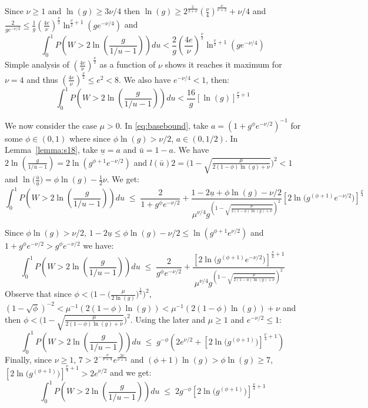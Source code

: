\documentclass[aos]{imsart}
\theoremstyle{plain}
\begin{document}
\begin{supplement}
Since $\nu \geq 1$ and $\ln(g) \geq 3\nu/4$ then $\ln(g) \geq 2^{\frac{2}{2+\nu}} \left(\frac{\nu}{4}\right)^{\frac{\nu}{\nu+2}}+\nu/4$ and $\frac{2}{g e^{-\nu / 2}}\leq \frac{1}{g} \left(\frac{4 e}{\nu}\right)^{\frac{\nu}{2}} \ln^{\frac{\nu}{2}+1}\left(ge^{-\nu / 4}\right)$ and 
\begin{equation*}
\int_0^1 P\left(W>2 \ln \left(\frac{g}{1 / u-1}\right)\right) d u < \frac{2}{g} \left(\frac{4 e}{\nu}\right)^{\frac{\nu}{2}} \ln^{\frac{\nu}{2}+1}\left(ge^{-\nu / 4}\right)
\end{equation*}
Simple analysis of $\left(\frac{4 e}{\nu}\right)^{\frac{\nu}{2}}$ as a function of $\nu$ shows it reaches it maximum for $\nu=4$ and thus $\left(\frac{4 e}{\nu}\right)^{\frac{\nu}{2}}\leq e^2 < 8$. We also have $e^{-\nu / 4} <1$, then:
\begin{equation*}
\int_0^1 P\left(W>2 \ln \left(\frac{g}{1 / u-1}\right)\right) d u < \frac{16}{g} [\ln\left(g\right)]^{\frac{\nu}{2}+1}
\end{equation*}

We now consider the case $\mu>0$. In \eqref{eq:basebound}, take  $a=\left(1+g^{\phi}e^{-\nu/ 2}\right)^{-1}$ for some $\phi\in(0,1)$ where since $\phi\ln(g)> \nu/2$, $a\in(0,1/2)$. In Lemma~\ref{lemma:s18}, take $\underline{u}=a$ and $\bar{u}=1-a$. We have  $2 \ln \left(\frac{g}{1 / \bar{u}-1}\right)=2\ln(g^{\phi+1}e^{-\nu/2})$ and $l(\bar{u})2=\big(1-\sqrt{\frac{\mu}{2(1-\phi)\ln(g)+\nu}}\big)^2<1$ and $\ln\big(\frac{\bar{u}}{\underline{u}}\big)=\phi\ln(g)-\tfrac{1}{2}\nu$. We get:
$$
\int_0^1 P\left(W>2 \ln \left(\frac{g}{1 / u-1}\right)\right) d u \;\leq\; \frac{2}{1+g^{\phi}e^{-\nu/2}}+ 
\frac{1-2\underline{u}+\phi\ln(g)-\nu/2}{\mu^{\nu/4}g^{(1-\sqrt{\frac{\mu}{2(1-\phi)\ln(g)+\nu}})^2}} \left[2\ln\big(g^{(\phi+1)}e^{-\nu/2}\big)\right]^{\frac{\nu}{4}} $$

Since $\phi\ln(g)> \nu/2$, $1-2\underline{u}\leq \phi\ln(g)-\nu/2 \leq \ln(g^{\phi+1}e^{\nu/2})$ and $1+g^{\phi}e^{-\nu/2}>g^{\phi}e^{-\nu/2}$ we have:
$$
\int_0^1 P\left(W>2 \ln \left(\frac{g}{1 / u-1}\right)\right) d u \;\leq\; \frac{2}{g^{\phi}e^{-\nu/2}}+ 
\frac{\left[2\ln\big(g^{(\phi+1)}e^{-\nu/2}\big)\right]^{\frac{\nu}{4}+1}}{\mu^{\nu/4}g^{(1-\sqrt{\frac{\mu}{2(1-\phi)\ln(g)+\nu}})^2}}  $$
Observe that since $\phi < \Big(1-\big(\frac{\mu}{2\ln(g)}\big)^{\frac{1}{3}}\Big)^2$, $(1-\sqrt{\phi})^{-2}<\mu^{-1}(2(1-\phi)\ln(g))<\mu^{-1}(2(1-\phi)\ln(g))+\nu$ and then $\phi<\big(1-\sqrt{\frac{\mu}{2(1-\phi)\ln(g)+\nu}}\big)^2$. Using the later and $\mu \geq1$ and $e^{-\nu/2}\leq 1$:
$$
\int_0^1 P\left(W>2 \ln \left(\frac{g}{1 / u-1}\right)\right) d u \;\leq\; g^{-\phi}\left(2e^{\nu/2}+ 
\left[2\ln\big(g^{(\phi+1)}\big)\right]^{\frac{\nu}{4}+1}  \right)$$
Finally, since $\nu \geq 1$, $7>2^{-\frac{\nu}{\nu+4}}e^{\frac{2\nu}{\nu+4}}$ and $(\phi+1)\ln(g)>\phi\ln(g)\geq 7$, $\left[2\ln\big(g^{(\phi+1)}\big)\right]^{\frac{\nu}{4}+1}>2e^{\nu/2}$ and we get:
$$
\int_0^1 P\left(W>2 \ln \left(\frac{g}{1 / u-1}\right)\right) d u \;\leq\; 2g^{-\phi} 
\left[2\ln\big(g^{(\phi+1)}\big)\right]^{\frac{\nu}{4}+1}  $$




\end{supplement}
\end{document}
